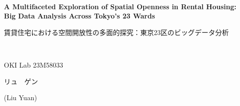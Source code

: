 \documentclass[11pt,a4paper]{article}
\begin{document}
\begin{center}
~\\
{\fontsize{12}{14}\selectfont \textbf{A Multifaceted Exploration of Spatial Openness in Rental Housing: Big Data Analysis Across Tokyo's 23 Wards}}\\
\begin{CJK}{UTF8}{min}
{\fontsize{11}{11}\selectfont 賃貸住宅における空間開放性の多面的探究：東京23区のビッグデータ分析}
\end{CJK}\\
\end{center}
\begin{flushright}
{\fontsize{11}{13}\selectfont  OKI Lab  23M58033 \begin{CJK}{UTF8}{min}リュ　ゲン\end{CJK} (Liu Yuan)}
\end{flushright}
\end{document}
